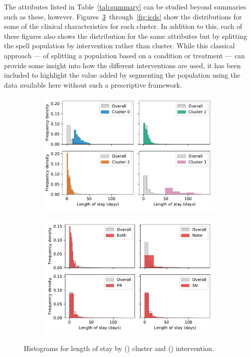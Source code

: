 \documentclass[11pt]{article}
\newlength{\imgwidth}
\begin{document}
The attributes listed in Table~\ref{tab:summary} can be studied beyond summaries
such as these, however. Figures~\ref{fig:los}~through~\ref{fig:icds} show the
distributions for some of the clinical characteristics for each cluster. In
addition to this, each of these figures also shows the distribution for the same
attributes but by splitting the spell population by intervention rather than
cluster. While this classical approach --- of splitting a population based on a
condition or treatment --- can provide some insight into how the different
interventions are used, it has been included to highlight the value added by
segmenting the population using the data available here without such a
prescriptive framework.

\begin{figure}
    \centering
    \begin{subfigure}{.5\imgwidth}
        \includegraphics[width=\linewidth]{img_cluster_true_los}
        \caption{}\label{fig:cluster_los}
    \end{subfigure}\hfill%
    \begin{subfigure}{.5\imgwidth}
        \includegraphics[width=\linewidth]{img_intervention_true_los}
        \caption{}\label{fig:intervention_los}
    \end{subfigure}
    \caption{%
        Histograms for length of stay by () cluster and
        () intervention.
    }\label{fig:los}
\end{figure}
\end{document}
